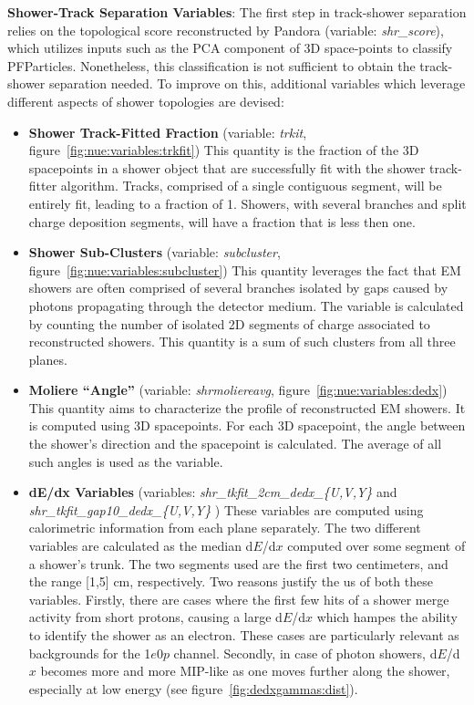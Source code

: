 \par \noindent \textbf{Shower-Track  Separation Variables}: The first step in track-shower separation relies on the topological score reconstructed by Pandora (variable: \emph{shr\_score}), which utilizes inputs such as the PCA component of 3D space-points to classify PFParticles. Nonetheless, this classification is not sufficient to obtain the track-shower separation needed. To improve on this, additional variables which leverage different aspects of shower topologies are devised:

\begin{itemize}

    \item[] \textbf{Shower Track-Fitted Fraction} (variable: \emph{trkit}, figure~\ref{fig:nue:variables:trkfit}) This quantity is the fraction of the 3D spacepoints in a shower object that are successfully fit with the shower track-fitter algorithm. Tracks, comprised of a single contiguous segment, will be entirely fit, leading to a fraction of 1. Showers, with several branches and split charge deposition segments, will have a fraction that is less then one.
    \item[] \textbf{Shower Sub-Clusters} (variable: \emph{subcluster}, figure~\ref{fig:nue:variables:subcluster}) This quantity leverages the fact that EM showers are often comprised of several branches isolated by gaps caused by photons propagating through the detector medium. The variable is calculated by counting the number of isolated 2D segments of charge associated to reconstructed showers. This quantity is a sum of such clusters from all three planes.
    \item[] \textbf{Moliere ``Angle''} (variable: \emph{shrmoliereavg}, figure~\ref{fig:nue:variables:dedx}) This quantity aims to characterize the profile of reconstructed EM showers. It is computed using 3D spacepoints. For each 3D spacepoint, the angle between the shower's direction and the spacepoint is calculated. The average of all such angles is used as the variable.
    \item[] \textbf{dE/dx Variables} (variables: \emph{shr\_tkfit\_2cm\_dedx\_\{U,V,Y\}} and \emph{shr\_tkfit\_gap10\_dedx\_\{U,V,Y\}} )  These variables are computed using calorimetric information from each plane separately. The two different variables are calculated as the median d$E$/d$x$ computed over some segment of a shower's trunk. The two segments used are the first two centimeters, and the range [1,5] cm, respectively. Two reasons justify the us of both these variables. Firstly, there are cases where the first few hits of a shower merge activity from short protons, causing a large d$E$/d$x$ which hampes the ability to identify the shower as an electron. These cases are particularly relevant as backgrounds for the 1$e$0$p$ channel. Secondly, in case of photon showers, d$E$/d$x$ becomes more and more MIP-like as one moves further along the shower, especially at low energy (see figure~\ref{fig:dedxgammas:dist}).
\end{itemize}{}



